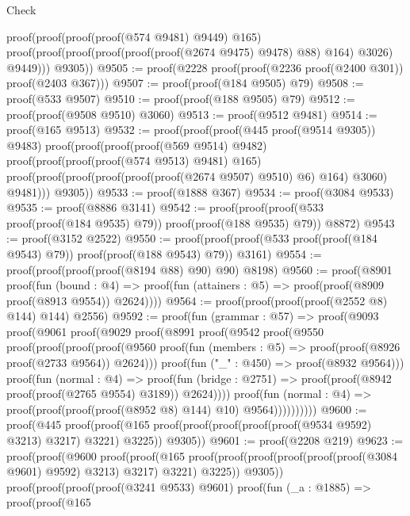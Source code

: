 \begin{lexlean}{Check}
\begin{coremodule}
            proof(proof(proof(proof(@574 @9481) @9449) @165)
                proof(proof(proof(proof(proof(proof(@2674 @9475) @9478) @88) @164) @3026) @9449)))
          @9305))
@9505 := proof(@2228 proof(proof(@2236 proof(@2400 @301)) proof(@2403 @367)))
@9507 := proof(proof(@184 @9505) @79)
@9508 := proof(@533 @9507)
@9510 := proof(proof(@188 @9505) @79)
@9512 := proof(proof(@9508 @9510) @3060)
@9513 := proof(@9512 @9481)
@9514 := proof(@165 @9513)
@9532 := proof(proof(proof(@445 proof(@9514 @9305)) @9483)
      proof(proof(proof(proof(@569 @9514) @9482)
            proof(proof(proof(proof(@574 @9513) @9481) @165)
                proof(proof(proof(proof(proof(proof(@2674 @9507) @9510) @6) @164) @3060) @9481)))
          @9305))
@9533 := proof(@1888 @367)
@9534 := proof(@3084 @9533)
@9535 := proof(@8886 @3141)
@9542 := proof(proof(proof(@533 proof(proof(@184 @9535) @79)) proof(proof(@188 @9535) @79)) @8872)
@9543 := proof(@3152 @2522)
@9550 := proof(proof(proof(@533 proof(proof(@184 @9543) @79)) proof(proof(@188 @9543) @79)) @3161)
@9554 := proof(proof(proof(proof(@8194 @88) @90) @90) @8198)
@9560 := proof(@8901
      proof(fun (bound : @4) =>
        proof(fun (attainers : @5) => proof(proof(@8909 proof(@8913 @9554)) @2624))))
@9564 := proof(proof(proof(proof(@2552 @8) @144) @144) @2556)
@9592 := proof(fun (grammar : @57) =>
    proof(@9093
        proof(@9061
            proof(@9029
                proof(@8991
                    proof(@9542
                        proof(@9550
                            proof(proof(proof(proof(@9560
                                      proof(fun (members : @5) =>
                                        proof(proof(@8926 proof(@2733 @9564)) @2624)))
                                    proof(fun ("_" : @450) => proof(@8932 @9564)))
                                  proof(fun (normal : @4) =>
                                    proof(fun (bridge : @2751) =>
                                      proof(proof(@8942 proof(proof(@2765 @9554) @3189)) @2624))))
                                proof(fun (normal : @4) =>
                                  proof(proof(proof(proof(@8952 @8) @144) @10) @9564))))))))))
@9600 := proof(@445
      proof(proof(@165 proof(proof(proof(proof(proof(@9534 @9592) @3213) @3217) @3221) @3225))
          @9305))
@9601 := proof(@2208 @219)
@9623 := proof(proof(@9600
        proof(proof(@165
              proof(proof(proof(proof(proof(proof(@3084 @9601) @9592) @3213) @3217) @3221) @3225))
            @9305))
      proof(proof(proof(proof(@3241 @9533) @9601)
            proof(fun (_a : @1885) =>
              proof(proof(@165

\end{coremodule}
\end{lexlean}

